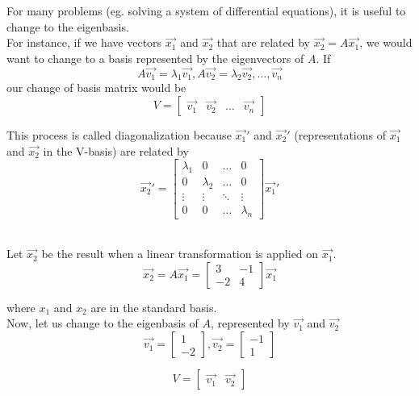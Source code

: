 \begin{enumerate}
\begin{adjustwidth}{-20pt}{0pt}
For many problems (eg. solving a system of differential equations), it is useful to change to the eigenbasis. \\
For instance, if we have vectors $\vec{x_1}$ and $\vec{x_2}$ that are related by $\vec{x_2} = A \vec{x_1}$, we would want to change to a basis represented by the eigenvectors of $A$.
If $$A \vec{v_1} = \lambda_1 \vec{v_1}, A \vec{v_2} = \lambda_2 \vec{v_2}, \dots, \vec{v_n} $$
our change of basis matrix would be
$$ V =
\begin{bmatrix}
\vec{v_1} & \vec{v_2} & \dots & \vec{v_n}
\end{bmatrix}
$$

This process is called diagonalization because $\vec{x_1}'$ and $\vec{x_2}'$ (representations of $\vec{x_1}$ and $\vec{x_2}$ in the V-basis) are related by
$$ \vec{x_2}' = 
\begin{bmatrix}
\lambda_1 & 0 & \dots & 0 \\
0 & \lambda_2 & \dots & 0 \\
\vdots & \vdots & \ddots & \vdots \\
0 & 0 & \dots & \lambda_n
\end{bmatrix} \vec{x_1}'
$$ \\

\end{adjustwidth}

\qitem Let $\vec{x_2}$ be the result when a linear transformation is applied on $\vec{x_1}$.
$$\vec{x_2} = A \vec{x_1} = 
\begin{bmatrix}
3 & -1 \\
-2 & 4
\end{bmatrix}
\vec{x_1}
$$

where $x_1$ and $x_2$ are in the standard basis. \\
Now, let us change to the eigenbasis of $A$, represented by $\vec{v_1}$ and $\vec{v_2}$
$$
\vec{v_1} = 
\begin{bmatrix}
1 \\
-2
\end{bmatrix}, 
\vec{v_2} =
\begin{bmatrix}
-1 \\
1
\end{bmatrix}
$$

$$ V =
\begin{bmatrix}
\vec{v_1} & \vec{v_2}
\end{bmatrix}
$$


\end{enumerate}
